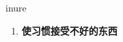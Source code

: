 
\begin{frame}
{\huge inure}
\begin{center}
\begin{enumerate}\Large
  \item \textbf{使习惯接受不好的东西}
\end{enumerate}
\end{center}
\end{frame}
